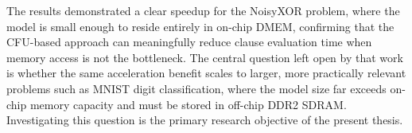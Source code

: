 The results demonstrated a clear speedup for the NoisyXOR problem, where the model is small enough to reside entirely in on-chip DMEM, confirming that the CFU-based approach can meaningfully reduce clause evaluation time when memory access is not the bottleneck. The central question left open by that work is whether the same acceleration benefit scales to larger, more practically relevant problems such as MNIST digit classification, where the model size far exceeds on-chip memory capacity and must be stored in off-chip DDR2 SDRAM. Investigating this question is the primary research objective of the present thesis.